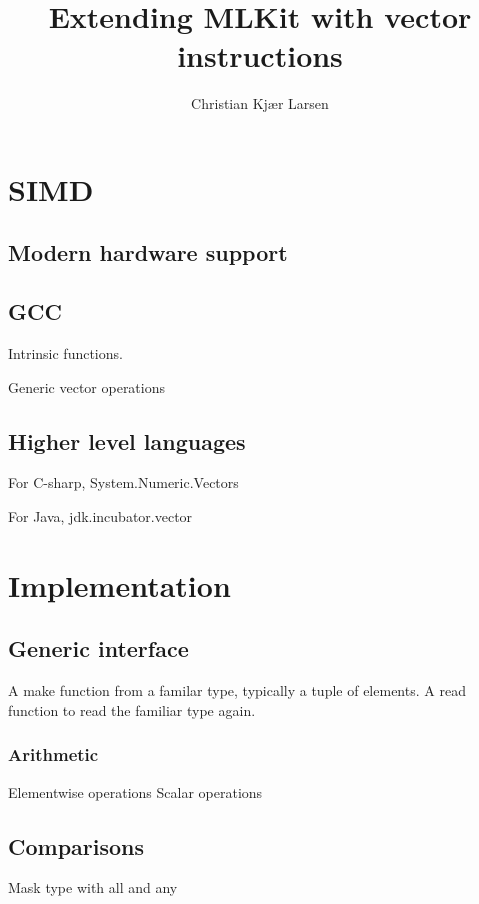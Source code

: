 \documentclass{article}
\title{Extending MLKit with vector instructions}
\author{Christian Kjær Larsen}
\begin{document}
\maketitle

\section{SIMD}

\subsection{Modern hardware support}

\subsection{GCC}

Intrinsic functions.

Generic vector operations

\subsection{Higher level languages}

For C-sharp, System.Numeric.Vectors

For Java, jdk.incubator.vector


\section{Implementation}


\subsection{Generic interface}


A make function from a familar type, typically a tuple of elements.
A read function to read the familiar type again.


\subsubsection{Arithmetic}

Elementwise operations
Scalar operations

\subsection{Comparisons}

Mask type with all and any
\end{document}
